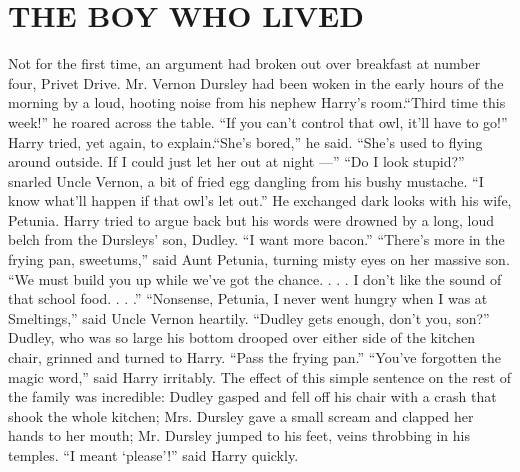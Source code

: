 \documentclass{article}%
\begin{document}
\section*{THE BOY WHO LIVED}%
\label{sec:THE BOY WHO LIVED}%
\flushleft%
 Not for the first time, an argument had broken out over breakfast at number four, Privet Drive.\newline%
	Mr. Vernon Dursley had been woken in the early hours of the morning by a loud, hooting noise from his nephew\newline%
	Harry’s room.“Third time this week!” he roared across the table. “If you can’t control that owl, it’ll have to go!” \newline%
	Harry tried, yet again, to explain.“She’s bored,” he said. “She’s used to flying around outside.\newline%
	If I could just let her out at night —” “Do I look stupid?” snarled Uncle Vernon, a bit of fried egg dangling\newline%
	from his bushy mustache. “I know what’ll happen if that owl’s let out.” He exchanged dark looks with his wife, Petunia. \newline%
	Harry tried to argue back but his words were drowned by a long, loud belch from the Dursleys’ son, Dudley.\newline%
	“I want more bacon.” “There’s more in the frying pan, sweetums,” said Aunt Petunia,\newline%
	turning misty eyes on her massive son. “We must build you up while we’ve got the chance. . . .\newline%
	I don’t like the sound of that school food. . . .” “Nonsense, Petunia, I never went hungry when I was at Smeltings,”\newline%
	said Uncle Vernon heartily. “Dudley gets enough, don’t you, son?” \newline%
\newline%
	Dudley, who was so large his bottom drooped over either side of the kitchen chair, grinned and turned to Harry.\newline%
	“Pass the frying pan.” “You’ve forgotten the magic word,” said Harry irritably.\newline%
	The effect of this simple sentence on the rest of the family was incredible: Dudley gasped and fell off his chair\newline%
	with a crash that shook the whole kitchen; Mrs. Dursley gave a small scream and clapped her hands to her mouth;\newline%
	Mr. Dursley jumped to his feet, veins throbbing in his temples. “I meant ‘please’!” said Harry quickly.\newline%
\end{document}
